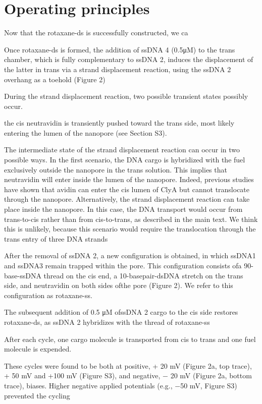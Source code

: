 \section{Operating principles}

Now that the rotaxane-ds is successfully constructed, we ca

Once rotaxane-ds is formed, the addition of ssDNA 4 (0.5μM) to the trans chamber, which
is fully complementary to ssDNA 2, induces the displacement of the latter in trans via a
strand displacement reaction, using the ssDNA 2 overhang as a toehold (Figure 2)

During the strand displacement reaction, two possible transient states possibly occur.


the cis neutravidin is transiently pushed toward
the trans side, most likely entering the lumen of the nanopore (see Section S3).

The intermediate state of the strand displacement reaction can occur in two possible
ways. In the first scenario, the DNA cargo is hybridized with the fuel exclusively
outside the nanopore in the trans solution. This implies that neutravidin will enter
inside the lumen of the nanopore. Indeed, previous studies have shown that avidin can
enter the cis lumen of ClyA but cannot translocate through the nanopore. Alternatively,
the strand displacement reaction can  take place inside the nanopore. In this case, the
DNA transport would occur from trans-to-cis rather than from cis-to-trans, as described
in the main text. We think this is unlikely, because this scenario would require the
translocation through the trans entry of three DNA strands


After the removal of ssDNA 2,
a new configuration is obtained, in which ssDNA1 and ssDNA3 remain trapped within the
pore. This configuration consists ofa 90-base-ssDNA thread on the cis end, a
10-basepair-dsDNA stretch on the trans side, and neutravidin on both sides ofthe pore
(Figure 2). We refer to this configuration as rotaxane-ss.

The subsequent addition of 0.5 μM ofssDNA 2 cargo to the cis side restores rotaxane-ds,
as ssDNA 2 hybridizes with the thread of rotaxane-ss

After each cycle, one cargo molecule is transported from cis to trans and one fuel
molecule is expended.

These cycles were found to be both at positive, + 20 mV (Figure 2a, top trace), + 50 mV
and +100 mV (Figure S3), and negative, − 20 mV (Figure 2a,
bottom trace), biases. Higher negative applied potentials (e.g., −50 mV, Figure S3)
prevented the cycling

